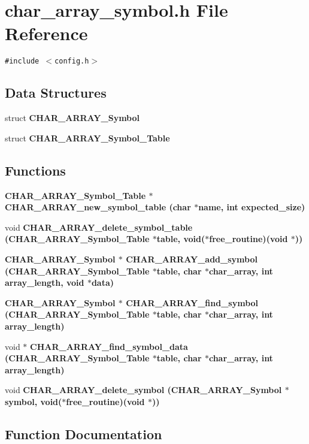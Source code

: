 \section{char\_\-array\_\-symbol.h File Reference}
\label{char__array__symbol_8h}
{\tt \#include $<$config.h$>$}\par
\subsection*{Data Structures}
\begin{CompactItemize}
\item 
struct \bf{CHAR\_\-ARRAY\_\-Symbol}
\item 
struct \bf{CHAR\_\-ARRAY\_\-Symbol\_\-Table}
\end{CompactItemize}
\subsection*{Functions}
\begin{CompactItemize}
\item 
\bf{CHAR\_\-ARRAY\_\-Symbol\_\-Table} $\ast$ \bf{CHAR\_\-ARRAY\_\-new\_\-symbol\_\-table} (char $\ast$\bf{name}, int expected\_\-size)
\item 
void \bf{CHAR\_\-ARRAY\_\-delete\_\-symbol\_\-table} (\bf{CHAR\_\-ARRAY\_\-Symbol\_\-Table} $\ast$table, void($\ast$free\_\-routine)(void $\ast$))
\item 
\bf{CHAR\_\-ARRAY\_\-Symbol} $\ast$ \bf{CHAR\_\-ARRAY\_\-add\_\-symbol} (\bf{CHAR\_\-ARRAY\_\-Symbol\_\-Table} $\ast$table, char $\ast$char\_\-array, int array\_\-length, void $\ast$data)
\item 
\bf{CHAR\_\-ARRAY\_\-Symbol} $\ast$ \bf{CHAR\_\-ARRAY\_\-find\_\-symbol} (\bf{CHAR\_\-ARRAY\_\-Symbol\_\-Table} $\ast$table, char $\ast$char\_\-array, int array\_\-length)
\item 
void $\ast$ \bf{CHAR\_\-ARRAY\_\-find\_\-symbol\_\-data} (\bf{CHAR\_\-ARRAY\_\-Symbol\_\-Table} $\ast$table, char $\ast$char\_\-array, int array\_\-length)
\item 
void \bf{CHAR\_\-ARRAY\_\-delete\_\-symbol} (\bf{CHAR\_\-ARRAY\_\-Symbol} $\ast$symbol, void($\ast$free\_\-routine)(void $\ast$))
\end{CompactItemize}


\subsection{Function Documentation}
